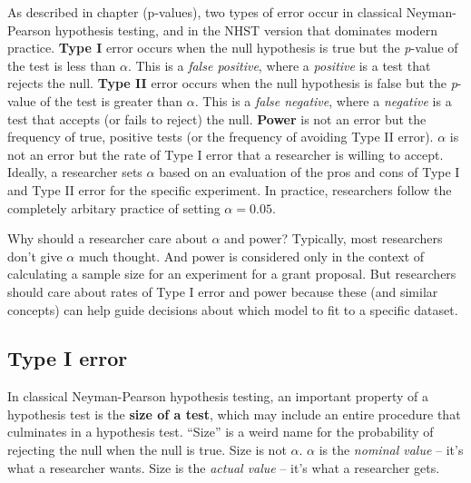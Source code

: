 \documentclass[]{book}
\begin{document}
As described in chapter (p-values), two types of error occur in classical Neyman-Pearson hypothesis testing, and in the NHST version that dominates modern practice. \textbf{Type I} error occurs when the null hypothesis is true but the \emph{p}-value of the test is less than \(\alpha\). This is a \emph{false positive}, where a \emph{positive} is a test that rejects the null. \textbf{Type II} error occurs when the null hypothesis is false but the \emph{p}-value of the test is greater than \(\alpha\). This is a \emph{false negative}, where a \emph{negative} is a test that accepts (or fails to reject) the null. \textbf{Power} is not an error but the frequency of true, positive tests (or the frequency of avoiding Type II error). \(\alpha\) is not an error but the rate of Type I error that a researcher is willing to accept. Ideally, a researcher sets \(\alpha\) based on an evaluation of the pros and cons of Type I and Type II error for the specific experiment. In practice, researchers follow the completely arbitary practice of setting \(\alpha = 0.05\).

Why should a researcher care about \(\alpha\) and power? Typically, most researchers don't give \(\alpha\) much thought. And power is considered only in the context of calculating a sample size for an experiment for a grant proposal. But researchers should care about rates of Type I error and power because these (and similar concepts) can help guide decisions about which model to fit to a specific dataset.

\hypertarget{type-i-error}{%
\subsection{Type I error}\label{type-i-error}}

In classical Neyman-Pearson hypothesis testing, an important property of a hypothesis test is the \textbf{size of a test}, which may include an entire procedure that culminates in a hypothesis test. ``Size'' is a weird name for the probability of rejecting the null when the null is true. Size is not \(\alpha\). \(\alpha\) is the \emph{nominal value} -- it's what a researcher wants. Size is the \emph{actual value} -- it's what a researcher gets.
\end{document}
